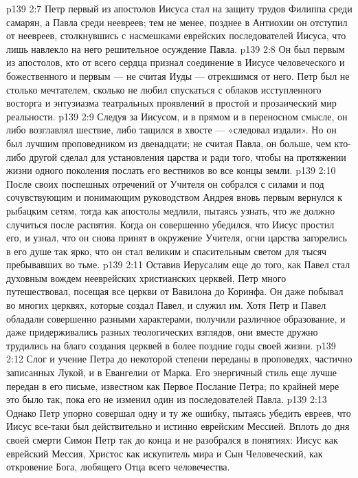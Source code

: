 \vs p139 2:7 Петр первый из апостолов Иисуса стал на защиту трудов Филиппа среди самарян, а Павла среди неевреев; тем не менее, позднее в Антиохии он отступил от неевреев, столкнувшись с насмешками еврейских последователей Иисуса, что лишь навлекло на него решительное осуждение Павла.
\vs p139 2:8 Он был первым из апостолов, кто от всего сердца признал соединение в Иисусе человеческого и божественного и первым --- не считая Иуды --- отрекшимся от него. Петр был не столько мечтателем, сколько не любил спускаться с облаков исступленного восторга и энтузиазма театральных проявлений в простой и прозаический мир реальности.
\vs p139 2:9 Следуя за Иисусом, и в прямом и в переносном смысле, он либо возглавлял шествие, либо тащился в хвосте --- «следовал издали». Но он был лучшим проповедником из двенадцати; не считая Павла, он больше, чем кто\hyp{}либо другой сделал для установления царства и ради того, чтобы на протяжении жизни одного поколения послать его вестников во все концы земли.
\vs p139 2:10 После своих поспешных отречений от Учителя он собрался с силами и под сочувствующим и понимающим руководством Андрея вновь первым вернулся к рыбацким сетям, тогда как апостолы медлили, пытаясь узнать, что же должно случиться после распятия. Когда он совершенно убедился, что Иисус простил его, и узнал, что он снова принят в окружение Учителя, огни царства загорелись в его душе так ярко, что он стал великим и спасительным светом для тысяч пребывавших во тьме.
\vs p139 2:11 \pc Оставив Иерусалим еще до того, как Павел стал духовным вождем нееврейских христианских церквей, Петр много путешествовал, посещая все церкви от Вавилона до Коринфа. Он даже побывал во многих церквях, которые создал Павел, и служил им. Хотя Петр и Павел обладали совершенно разными характерами, получили различное образование, и даже придерживались разных теологических взглядов, они вместе дружно трудились на благо создания церквей в более поздние годы своей жизни.
\vs p139 2:12 \pc Слог и учение Петра до некоторой степени переданы в проповедях, частично записанных Лукой, и в Евангелии от Марка. Его энергичный стиль еще лучше передан в его письме, известном как Первое Послание Петра; по крайней мере это было так, пока его не изменил один из последователей Павла.
\vs p139 2:13 Однако Петр упорно совершал одну и ту же ошибку, пытаясь убедить евреев, что Иисус все\hyp{}таки был действительно и истинно еврейским Мессией. Вплоть до дня своей смерти Симон Петр так до конца и не разобрался в понятиях: Иисус как еврейский Мессия, Христос как искупитель мира и Сын Человеческий, как откровение Бога, любящего Отца всего человечества.
